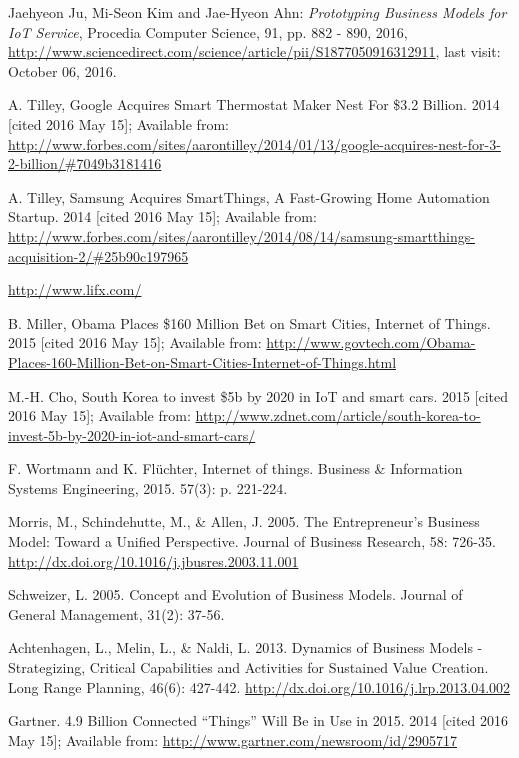 \begin{thebibliography}{99}
	 Jaehyeon Ju, Mi-Seon Kim and Jae-Hyeon Ahn: \emph{Prototyping Business Models for IoT Service}, Procedia Computer Science, 91, pp. 882 - 890, 2016, \url{http://www.sciencedirect.com/science/article/pii/S1877050916312911}, last visit: October 06, 2016.
 	
 	  A. Tilley, Google Acquires Smart Thermostat Maker Nest For \$3.2 Billion. 2014  [cited 2016 May 15]; Available from: \url{http://www.forbes.com/sites/aarontilley/2014/01/13/google-acquires-nest-for-3-2-billion/#7049b3181416}

 	  A. Tilley, Samsung Acquires SmartThings, A Fast-Growing Home Automation Startup. 2014  [cited 2016 May 15]; Available from: \url{http://www.forbes.com/sites/aarontilley/2014/08/14/samsung-smartthings-acquisition-2/#25b90c197965}

 	 \url{http://www.lifx.com/}

 	 B. Miller, Obama Places \$160 Million Bet on Smart Cities, Internet of Things. 2015  [cited 2016 May 15]; Available from: \url{http://www.govtech.com/Obama-Places-160-Million-Bet-on-Smart-Cities-Internet-of-Things.html}

	 M.-H. Cho, South Korea to invest \$5b by 2020 in IoT and smart cars. 2015  [cited 2016 May 15]; Available from: \url{http://www.zdnet.com/article/south-korea-to-invest-5b-by-2020-in-iot-and-smart-cars/}

	  F. Wortmann and K. Flüchter, Internet of things. Business \& Information Systems Engineering, 2015. 57(3): p. 221-224.

	 Morris, M., Schindehutte, M., \& Allen, J. 2005. The Entrepreneur's Business Model: Toward a Unified Perspective. Journal of Business Research, 58: 726-35. \url{http://dx.doi.org/10.1016/j.jbusres.2003.11.001}

	 Schweizer, L. 2005. Concept and Evolution of Business Models. Journal of General Management, 31(2): 37-56.

	 Achtenhagen, L., Melin, L., \& Naldi, L. 2013. Dynamics of Business Models - Strategizing, Critical Capabilities and Activities for Sustained Value Creation. Long Range Planning, 46(6): 427-442. \url{http://dx.doi.org/10.1016/j.lrp.2013.04.002}

 	  Gartner. 4.9 Billion Connected ``Things'' Will Be in Use in 2015. 2014  [cited 2016 May 15]; Available from: \url{http://www.gartner.com/newsroom/id/2905717}


\end{thebibliography}
